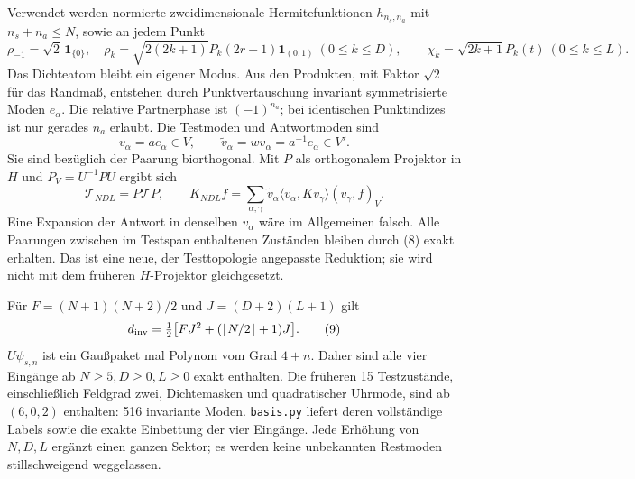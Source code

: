 \documentclass[10pt,a4paper]{article}
\newcommand{\one}{\mathbf1}\newcommand{\norm}[1]{\lVert#1\rVert}
\newcommand{\TT}{\mathcal T}\newcommand{\EE}{\mathbb E}\newcommand{\HS}{\mathrm{HS}}
\begin{document}
Verwendet werden normierte zweidimensionale Hermitefunktionen
$h_{n_s,n_a}$ mit $n_s+n_a\le N$, sowie an jedem Punkt
\[
 \rho_{-1}=\sqrt2\,\one_{\{0\}},\quad
 \rho_k=\sqrt{2(2k+1)}P_k(2r-1)\one_{(0,1)}\ (0\le k\le D),\qquad
 \chi_k=\sqrt{2k+1}P_k(t)\ (0\le k\le L).                 \tag{6}
\]
Das Dichteatom bleibt ein eigener Modus. Aus den Produkten, mit Faktor $\sqrt2$
für das Randmaß, entstehen durch Punktvertauschung invariant symmetrisierte
Moden $e_\alpha$. Die relative Partnerphase ist $(-1)^{n_a}$; bei identischen
Punktindizes ist nur gerades $n_a$ erlaubt. Die Testmoden und Antwortmoden sind
\[
 v_\alpha=a e_\alpha\in V,\qquad
 \widetilde v_\alpha=w v_\alpha=a^{-1}e_\alpha\in V'.       \tag{7}
\]
Sie sind bezüglich der Paarung biorthogonal. Mit $P$ als orthogonalem
Projektor in $H$ und $P_V=U^{-1}PU$ ergibt sich
\[
 \TT_{N D L}=P\TT P,\qquad
 K_{N D L}f=\sum_{\alpha,\gamma}
 \widetilde v_\alpha\langle v_\alpha,Kv_\gamma\rangle
                  (v_\gamma,f)_V.                       \tag{8}
\]
Eine Expansion der Antwort in denselben $v_\alpha$ wäre im Allgemeinen falsch.
Alle Paarungen zwischen im Testspan enthaltenen Zuständen bleiben durch (8)
exakt erhalten. Das ist eine neue, der Testtopologie angepasste Reduktion;
sie wird nicht mit dem früheren $H$-Projektor gleichgesetzt.

Für $F=(N+1)(N+2)/2$ und $J=(D+2)(L+1)$ gilt
\[
 d_{\rm inv}=\tfrac12\bigl[FJ^2+(\lfloor N/2\rfloor+1)J\bigr].       \tag{9}
\]
$U\psi_{s,n}$ ist ein Gaußpaket mal Polynom vom Grad $4+n$.
Daher sind alle vier Eingänge ab $N\ge5,D\ge0,L\ge0$ exakt enthalten.
Die früheren 15 Testzustände, einschließlich Feldgrad zwei, Dichtemasken und
quadratischer Uhrmode, sind ab $(6,0,2)$ enthalten: 516 invariante Moden.
\texttt{basis.py} liefert deren vollständige Labels sowie die exakte Einbettung
der vier Eingänge. Jede Erhöhung von $N,D,L$ ergänzt einen ganzen Sektor;
es werden keine unbekannten Restmoden stillschweigend weggelassen.
\newpage
\end{document}
